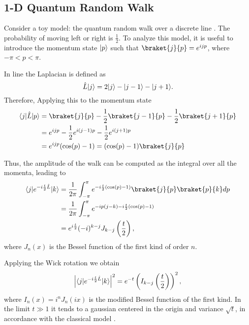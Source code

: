 \subsection{1-D Quantum Random Walk}
Consider a toy model: the quantum random walk over a discrete line \cite{Farhi_98}. The probability of moving left or right is $\frac{1}{2}$.
To analyze this model, it is useful to introduce the momentum state $\lvert p\rangle$ such that $\braket{j}{p} = e^{ijp}$, where $-\pi < p< \pi$.

In line the Laplacian is defined as
\begin{equation}
    \hat L \lvert j\rangle = 2\lvert j\rangle -\lvert j-1\rangle -\lvert j+1\rangle . 
\end{equation}
Therefore, Applying this to the momentum state
\begin{equation}
    \begin{split}
        \bra{j}\hat L \ket{p} &= \braket{j}{p} -\frac{1}{2}\braket{j-1}{p} -\frac{1}2{}\braket{j+1}{p}\\
        &= e^{ijp} -\frac{1}{2}e^{i(j-1)p} - \frac{1}{2}e^{i(j+1)p}\\
        &= e^{ijp}(\cos(p) - 1) = (\cos(p) - 1)\braket{j}{p}
    \end{split}
\end{equation}

Thus, the amplitude of the walk can be computed as the integral over all the momenta, leading to
\begin{equation}
    \begin{split}
        \bra{j}e^{-i\frac{t}{2}\hat L} \ket{k}&= \frac{1}{2\pi}\int_{-\pi}^{\pi} e^{-i\frac{t}{2}(\cos(p) - 1)} \braket{j}{p} \braket{p}{k} dp\\
        &= \frac{1}{2\pi}\int_{-\pi}^{\pi} e^{-ip(j-k)-i\frac{t}{2}(\cos(p) - 1)}\\
        & = e^{i\frac{t}{2}}(-i)^{k-j}J_{k-j}\left(\frac{t}{2}\right),
   \end{split}
\end{equation}
where $J_{n}(x)$ is the Bessel function of the first kind of order $n$.

Applying the Wick rotation we obtain 
\begin{equation}\label{Bessel_function}
    \left|\langle j\rvert e^{-i\frac{t}{2}\hat L} \lvert k\rangle\right|^2 = e^{-t} \left(I_{k-j}\left(\frac{t}{2}\right)\right)^2,
\end{equation}
where $I_{n}(x) = i^{n}J_{n}(ix)$ is the modified Bessel function of the first kind.
In the limit $t\gg 1$ it tends to a gaussian centered in the origin and variance $\sqrt{t}$, in accordance with the classical model \cite{mabramowitz64:handbook}.

